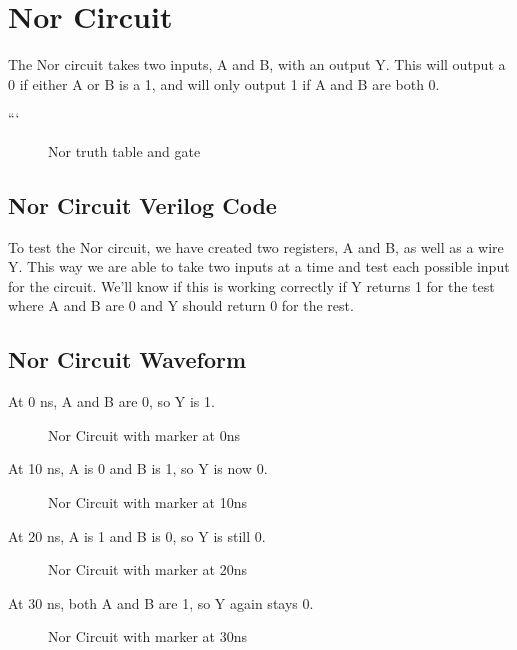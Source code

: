 \documentclass[12pt]{article}
\begin{document}
 \section{Nor Circuit}
The Nor circuit takes two inputs, A and B, with an output Y. This will output a 0 if either A or B is a 1, and will only output 1 if A and B are both 0.

```\begin{figure}[H]
    \centering
    \caption{Nor truth table and gate}
    \label{fig:shift-table}
\end{figure}

\subsection{Nor Circuit Verilog Code}


To test the Nor circuit, we have created two registers, A and B, as well as a wire Y. This way we are able to take two inputs at a time and test each possible input for the circuit. We'll know if this is working correctly if Y returns 1 for the test where A and B are 0 and Y should return 0 for the rest.
%
\subsection{Nor Circuit Waveform}

At 0 ns, A and B are 0, so Y is 1.
\begin{figure}[H]
    \centering
    \caption{Nor Circuit with marker at 0ns}
    \label{fig:enter-label}
\end{figure}

At 10 ns, A is 0 and B is 1, so Y is now 0.
\begin{figure}[H]
    \centering
    \caption{Nor Circuit with marker at 10ns}
    \label{fig:enter-label}
\end{figure}

At 20 ns, A is 1 and B is 0, so Y is still 0.
\begin{figure}[H]
    \centering
    \caption{Nor Circuit with marker at 20ns}
    \label{fig:enter-label}
\end{figure}

At 30 ns, both A and B are 1, so Y again stays 0.
\begin{figure}[H]
    \centering
    \caption{Nor Circuit with marker at 30ns}
    \label{fig:enter-label}
\end{figure}
\end{document}

